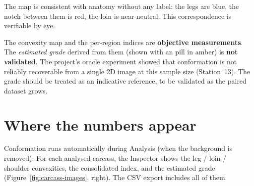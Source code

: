 
The map is consistent with anatomy without any label: the legs are blue, the
notch between them is red, the loin is near-neutral. This correspondence is
verifiable by eye.

\begin{caution}[title=The estimated grade is not validated]
The convexity map and the per-region indices are \textbf{objective measurements}.
The \emph{estimated grade} derived from them (shown with an  pill in
amber) is \textbf{not validated}. The project's oracle experiment showed that
conformation is not reliably recoverable from a single 2D image at this sample
size (Station~13). The grade should be treated as an indicative reference, to be
validated as the paired dataset grows.
\end{caution}

\section{Where the numbers appear}

Conformation runs automatically during Analysis (when the background is removed).
For each analysed carcass, the Inspector shows the leg / loin / shoulder
convexities, the consolidated index, and the estimated grade
(Figure~\ref{fig:carcass-images}, right). The CSV export includes all of them.
